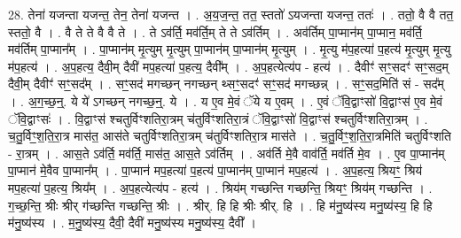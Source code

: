 \documentclass[17pt]{extarticle}
\begin{document}
28. तेना॑ यजन्ता यजन्त॒ तेन॒ तेना॑ यजन्त । . अ॒य॒ज॒न्त॒ तत॒ स्ततो॑ ऽयजन्ता यजन्त॒ ततः॑ । . ततो॒ वै वै तत॒ स्ततो॒ वै । . वै ते ते वै वै ते । . ते ऽव॑र्ति॒ मव॑र्ति॒म् ते ते ऽव॑र्तिम् । . अव॑र्तिम् पा॒प्मान॑म् पा॒प्मान॒ मव॑र्ति॒ मव॑र्तिम् पा॒प्मान᳚म् । . पा॒प्मान॑म् मृ॒त्युम् मृ॒त्युम् पा॒प्मान॑म् पा॒प्मान॑म् मृ॒त्युम् । . मृ॒त्यु म॑प॒हत्या॑ प॒हत्य॑ मृ॒त्युम् मृ॒त्यु म॑प॒हत्य॑ । . अ॒प॒हत्य॒ दैवी॒म् दैवी॑ मप॒हत्या॑ प॒हत्य॒ दैवी᳚म् । . अ॒प॒हत्येत्य॑प - हत्य॑ । . दैवीꣳ॑ सꣳ॒॒सदꣳ॑ सꣳ॒॒सद॒म् दैवी॒म् दैवीꣳ॑ सꣳ॒॒सद᳚म् । . सꣳ॒॒सद॑ मगच्छन् नगच्छन् थ्सꣳ॒॒सदꣳ॑ सꣳ॒॒सद॑ मगच्छन्न् । . सꣳ॒॒सद॒मिति॑ सं - सद᳚म् । . अ॒ग॒च्छ॒न्॒. ये ये॑ ऽगच्छन् नगच्छ॒न्॒. ये । . य ए॒व मे॒वं ॅये य ए॒वम् । . ए॒वं ॅवि॒द्वाꣳसो॑ वि॒द्वाꣳस॑ ए॒व मे॒वं ॅवि॒द्वाꣳसः॑ । . वि॒द्वाꣳस॑ श्चतुर्विꣳशतिरा॒त्रम् च॑तुर्विꣳशतिरा॒त्रं ॅवि॒द्वाꣳसो॑ वि॒द्वाꣳस॑ श्चतुर्विꣳशतिरा॒त्रम् । . च॒तु॒र्विꣳ॒॒श॒ति॒रा॒त्र मास॑त॒ आस॑ते चतुर्विꣳशतिरा॒त्रम् च॑तुर्विꣳशतिरा॒त्र मास॑ते । . च॒तु॒र्विꣳ॒॒श॒ति॒रा॒त्रमिति॑ चतुर्विꣳशति - रा॒त्रम् । . आस॒ते ऽव॑र्ति॒ मव॑र्ति॒ मास॑त॒ आस॒ते ऽव॑र्तिम् । . अव॑र्ति मे॒वै वाव॑र्ति॒ मव॑र्ति मे॒व । . ए॒व पा॒प्मान॑म् पा॒प्मान॑ मे॒वैव पा॒प्मान᳚म् । . पा॒प्मान॑ मप॒हत्या॑ प॒हत्य॑ पा॒प्मान॑म् पा॒प्मान॑ मप॒हत्य॑ । . अ॒प॒हत्य॒ श्रियꣳ॒॒ श्रिय॑ मप॒हत्या॑ प॒हत्य॒ श्रिय᳚म् । . अ॒प॒हत्येत्य॑प - हत्य॑ । . श्रिय॑म् गच्छन्ति गच्छन्ति॒ श्रियꣳ॒॒ श्रिय॑म् गच्छन्ति । . ग॒च्छ॒न्ति॒ श्रीः श्रीर् ग॑च्छन्ति गच्छन्ति॒ श्रीः । . श्रीर्. हि हि श्रीः श्रीर्. हि । . हि म॑नु॒ष्य॑स्य मनु॒ष्य॑स्य॒ हि हि म॑नु॒ष्य॑स्य । . म॒नु॒ष्य॑स्य॒ दैवी॒ दैवी॑ मनु॒ष्य॑स्य मनु॒ष्य॑स्य॒ दैवी᳚ । \newline
\end{document}
